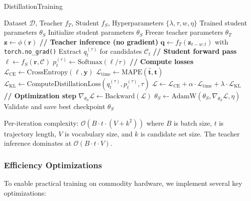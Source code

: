 \begin{algorithm}[t]
\caption{DistillationTraining}
\label{alg:distill-train}
\begin{algorithmic}
\Require Dataset $\mathcal{D}$, Teacher $f_T$, Student $f_S$, Hyperparameters $\{\lambda, \tau, w, \eta\}$
\Ensure Trained student parameters $\theta_S$
\State Initialize student parameters $\theta_S$
\State Freeze teacher parameters $\theta_T$ 
     
        \State $\mathbf{z} \gets \phi(\mathbf{r})$ 
        \State \textbf{// Teacher inference (no gradient)}
        \State $\mathbf{q} \gets f_T(\mathbf{z}_{t-w:t})$ with \texttt{torch.no\_grad()}
        \State Extract $q_t^{(\tau)}$ for candidates $\mathcal{C}_t$ 
        \State \textbf{// Student forward pass}
        \State $\mathbf{\ell} \gets f_S(\mathbf{r}, \mathcal{C})$ 
        \State $p_t^{(\tau)} \gets \text{Softmax}(\mathbf{\ell} / \tau)$
        \State \textbf{// Compute losses}
        \State $\mathcal{L}_{\text{CE}} \gets \text{CrossEntropy}(\mathbf{\ell}, \mathbf{y})$
        \State $\mathcal{L}_{\text{time}} \gets \text{MAPE}(\hat{\mathbf{t}}, \mathbf{t})$
        \State $\mathcal{L}_{\text{KL}} \gets \text{ComputeDistillationLoss}(q_t^{(\tau)}, p_t^{(\tau)}, \tau)$
        \State $\mathcal{L} \gets \mathcal{L}_{\text{CE}} + \alpha \cdot \mathcal{L}_{\text{time}} + \lambda \cdot \mathcal{L}_{\text{KL}}$
        \State \textbf{// Optimization step}
        \State $\nabla_{\theta_S} \mathcal{L} \gets \text{Backward}(\mathcal{L})$
        \State $\theta_S \gets \text{AdamW}(\theta_S, \nabla_{\theta_S} \mathcal{L}, \eta)$
    \EndFor
    \State Validate and save best checkpoint
\EndFor
\State \Return $\theta_S$
\end{algorithmic}
\end{algorithm}

\begin{remark}
Per-iteration complexity: $\mathcal{O}(B \cdot t \cdot (V + k^2))$ where $B$ is batch size, $t$ is trajectory length, $V$ is vocabulary size, and $k$ is candidate set size. The teacher inference dominates at $\mathcal{O}(B \cdot t \cdot V)$.
\end{remark}

\subsubsection{Efficiency Optimizations}
\label{sec:method-opt}
To enable practical training on commodity hardware, we implement several key optimizations:

